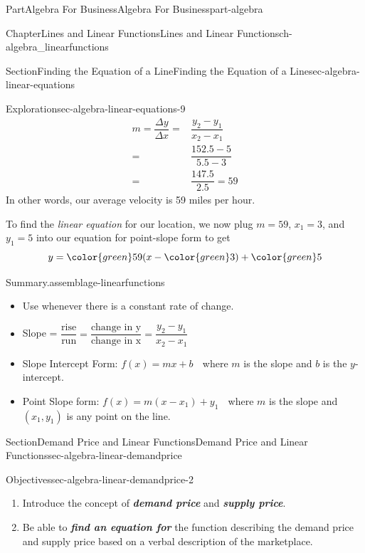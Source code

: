 \documentclass[oneside,10pt,]{tufte-book}
\newcommand{\alert}[1]{\textbf{\textit{#1}}}
\numberwithin{equation}{chapter}
\newcommand{\amp}{&}
\begin{document}
\begin{partptx}{Part}{Algebra For Business}{}{Algebra For Business}{}{}{part-algebra}
\begin{chapterptx}{Chapter}{Lines and Linear Functions}{}{Lines and Linear Functions}{}{}{ch-algebra_linearfunctions}
\begin{sectionptx}{Section}{Finding the Equation of a Line}{}{Finding the Equation of a Line}{}{}{sec-algebra-linear-equations}
\begin{exploration}{Exploration}{}{sec-algebra-linear-equations-9}
\begin{align*}
m = \dfrac{\Delta y}{\Delta x} = \amp \dfrac{y_2-y_1}{x_2-x_1}\\
= \amp \dfrac{152.5-5}{5.5-3}\\
=  \amp \dfrac {147.5}{2.5} = 59 
\end{align*}
In other words, our average velocity is 59 miles per hour.%
\par
To find the \emph{linear equation} for our location, we now plug \(m=59\), \(x_1 = 3\), and \(y_1 = 5\) into our equation for point-slope form to get%
\begin{equation*}
y = {\color{green} 59} (x - { \color{green} 3}) + {\color{green} 5}
\end{equation*}
%
\end{exploration}%
\begin{assemblage}{Summary}{.}{assemblage-linearfunctions}%
%
\begin{itemize}[label=\textbullet]
\item{}Use whenever there is a constant rate of change.%
\item{}Slope = \(\dfrac{\text{rise}}{\text{run}} = \dfrac{\text{change in y}}{\text{change in x}} = \dfrac{y_2-y_1}{x_2-x_1}\)%
\item{}Slope Intercept Form: \(f(x) = mx + b\) \(\phantom{.}\) where \(m\) is the slope and \(b\) is the \(y\)-intercept.%
\item{}Point Slope form: \(f(x) = m(x-x_1) + y_1\) \(\phantom{.}\) where \(m\) is the slope and \((x_1,y_1)\) is any point on the line.%
\end{itemize}
%
\end{assemblage}
\end{sectionptx}
%
%
\typeout{************************************************}
\typeout{************************************************}
%
\begin{sectionptx}{Section}{Demand Price and Linear Functions}{}{Demand Price and Linear Functions}{}{}{sec-algebra-linear-demandprice}
\begin{objectives}{Objectives}{sec-algebra-linear-demandprice-2}
%
\begin{enumerate}
\item{}Introduce the concept of \alert{demand price} and \alert{supply price}.%
\item{}Be able to \alert{find an equation for} the function describing the demand price and supply price based on a verbal description of the marketplace.%

\end{enumerate}
\end{objectives}
\end{sectionptx}
\end{chapterptx}
\end{partptx}
\end{document}
